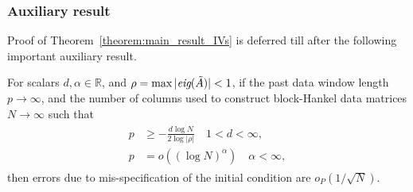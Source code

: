 \subsubsection{Auxiliary result}
\noindent Proof of Theorem~\ref{theorem:main_result_IVs} is deferred till after the following important auxiliary result.
\setcounter{thm}{0}
\begin{lem}\label{lem:relative_rates}\citep{Chiuso2006}
    For scalars $d,\alpha\in\mathbb{R}$, and ${\rho=\max|\emph{eig}(\tilde{A})|<1}$, if the past data window length ${p\rightarrow\infty}$, and the number of columns used to construct block-Hankel data matrices $N\rightarrow\infty$ such that%
    \begin{align}\label{eq:relative_rates}
        \begin{split}
            p &\geq -\frac{d\log N}{2\log|\rho|} \quad 1 < d < \infty,\\
            p&=o((\log N)^\alpha) \quad \alpha < \infty,%
        \end{split}
    \end{align}
    then errors due to mis-specification of the initial condition are $o_P(1/\sqrt{N})$.
\end{lem}

